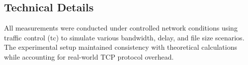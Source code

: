 \documentclass[11pt,letterpaper]{article}
\begin{document}
\subsection{Technical Details}

All measurements were conducted under controlled network conditions using traffic control (tc) to simulate various bandwidth, delay, and file size scenarios. The experimental setup maintained consistency with theoretical calculations while accounting for real-world TCP protocol overhead.

\end{document}
